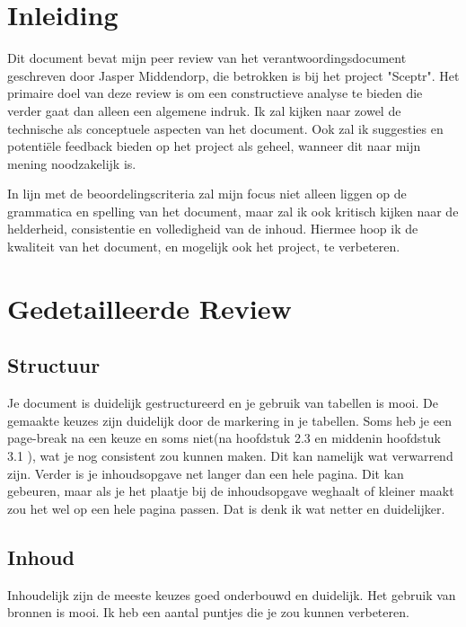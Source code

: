 \documentclass[a4paper]{article}
\begin{document}
\tableofcontents
\clearpage

\section{Inleiding}
Dit document bevat mijn peer review van het verantwoordingsdocument geschreven door Jasper Middendorp, die betrokken is bij het project "Sceptr". 
Het primaire doel van deze review is om een constructieve analyse te bieden die verder gaat dan alleen een algemene indruk. 
Ik zal kijken naar zowel de technische als conceptuele aspecten van het document. Ook zal ik suggesties en potentiële feedback bieden op het project als geheel, wanneer dit naar mijn mening noodzakelijk is.
\par \smallskip
In lijn met de beoordelingscriteria zal mijn focus niet alleen liggen op de grammatica en spelling van het document, maar zal ik ook kritisch kijken naar de helderheid, consistentie en volledigheid van de inhoud.
Hiermee hoop ik de kwaliteit van het document, en mogelijk ook het project, te verbeteren.


\section{Gedetailleerde Review}
\subsection{Structuur}
Je document is duidelijk gestructureerd en je gebruik van tabellen is mooi.
De gemaakte keuzes zijn duidelijk door de markering in je tabellen.
Soms heb je een page-break na een keuze en soms niet(na hoofdstuk 2.3 en middenin hoofdstuk 3.1 ), wat je nog consistent zou kunnen maken. Dit kan namelijk wat verwarrend zijn.
Verder is je inhoudsopgave net langer dan een hele pagina. Dit kan gebeuren, maar als je het plaatje bij de inhoudsopgave weghaalt of kleiner maakt zou het wel op een hele pagina passen.
Dat is denk ik wat netter en duidelijker.




\subsection{Inhoud}
Inhoudelijk zijn de meeste keuzes goed onderbouwd en duidelijk. Het gebruik van bronnen is mooi.
Ik heb een aantal puntjes die je zou kunnen verbeteren.
\end{document}
